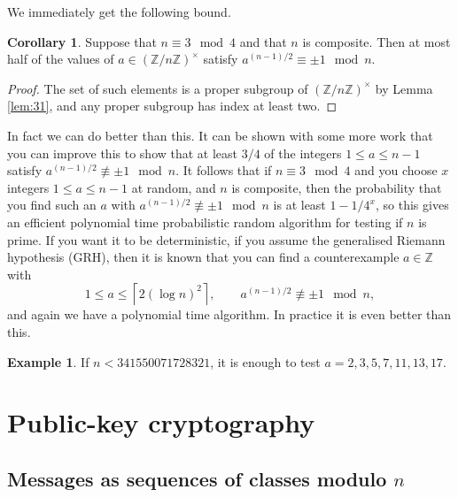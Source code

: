\documentclass{article}
\newcommand{\Z}{\mathbb{Z}}
\newcommand{\rb}[1]{\left( #1 \right)}
\newcommand{\unit}[1]{\rb{\Z / #1\Z}^\times}
\theoremstyle{definition}\newtheorem{definition}{Definition}
\theoremstyle{definition}\newtheorem{remark}[definition]{Remark}
\theoremstyle{definition}\newtheorem*{example}{Example}
\theoremstyle{definition}\newtheorem*{note}{Note}
\newtheorem{corollary}[definition]{Corollary}
\begin{document}
We immediately get the following bound.

\begin{corollary}
Suppose that $ n \equiv 3 \mod 4 $ and that $ n $ is composite. Then at most half of the values of $ a \in \unit{n} $ satisfy $ a^{\rb{n - 1} / 2} \equiv \pm 1 \mod n $.
\end{corollary}

\begin{proof}
The set of such elements is a proper subgroup of $ \unit{n} $ by Lemma \ref{lem:31}, and any proper subgroup has index at least two.
\end{proof}

In fact we can do better than this. It can be shown with some more work that you can improve this to show that at least $ 3 / 4 $ of the integers $ 1 \le a \le n - 1 $ satisfy $ a^{\rb{n - 1} / 2} \not\equiv \pm 1 \mod n $. It follows that if $ n \equiv 3 \mod 4 $ and you choose $ x $ integers $ 1 \le a \le n - 1 $ at random, and $ n $ is composite, then the probability that you find such an $ a $ with $ a^{\rb{n - 1} / 2} \not\equiv \pm 1 \mod n $ is at least $ 1 - 1 / 4^x $, so this gives an efficient polynomial time probabilistic random algorithm for testing if $ n $ is prime. If you want it to be deterministic, if you assume the generalised Riemann hypothesis (GRH), then it is known that you can find a counterexample $ a \in \Z $ with
$$ 1 \le a \le \left\lceil 2 \rb{\log n}^2 \right\rceil, \qquad a^{\rb{n - 1} / 2} \not\equiv \pm 1 \mod n, $$
and again we have a polynomial time algorithm. In practice it is even better than this.

\begin{example}
If $ n < 341550071728321 $, it is enough to test $ a = 2, 3, 5, 7, 11, 13, 17 $.
\end{example}

\section{Public-key cryptography}

\subsection{Messages as sequences of classes modulo $ n $}
\end{document}
